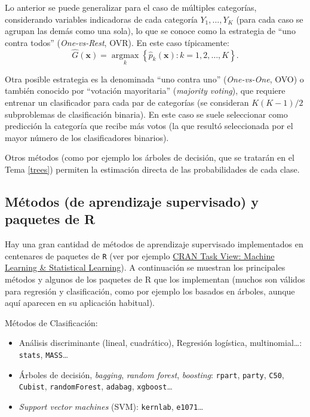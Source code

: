 \documentclass[
]{book}
\theoremstyle{break}
\theoremstyle{nonumberplain}
\begin{document}
Lo anterior se puede generalizar para el caso de múltiples categorías, considerando variables indicadoras de cada categoría \(Y_1, \ldots, Y_K\) (para cada caso se agrupan las demás como una sola), lo que se conoce como la estrategia de ``uno contra todos'' (\emph{One-vs-Rest}, OVR).
En este caso típicamente: \[\hat G \left(\mathbf{x} \right) = \underset{k}{\operatorname{argmax}} \left\{ \hat p_k(\mathbf{x}) : k = 1, 2, \ldots, K \right\}.\]

Otra posible estrategia es la denominada ``uno contra uno'' (\emph{One-vs-One}, OVO) o también conocido por ``votación mayoritaria'' (\emph{majority voting}), que requiere entrenar un clasificador para cada par de categorías (se consideran \(K(K-1)/2\) subproblemas de clasificación binaria).
En este caso se suele seleccionar como predicción la categoría que recibe más votos (la que resultó seleccionada por el mayor número de los clasificadores binarios).

Otros métodos (como por ejemplo los árboles de decisión, que se tratarán en el Tema \ref{trees}) permiten la estimación directa de las probabilidades de cada clase.

\hypertarget{metodos-pkgs}{%
\subsection{Métodos (de aprendizaje supervisado) y paquetes de R}\label{metodos-pkgs}}

Hay una gran cantidad de métodos de aprendizaje supervisado implementados en centenares de paquetes de \texttt{R} (ver por ejemplo \href{https://cran.r-project.org/web/views/MachineLearning.html}{CRAN Task View: Machine Learning \& Statistical Learning}).
A continuación se muestran los principales métodos y algunos de los paquetes de R que los implementan (muchos son válidos para regresión y clasificación, como por ejemplo los basados en árboles, aunque aquí aparecen en su aplicación habitual).

Métodos de Clasificación:

\begin{itemize}
\item
  Análisis discriminante (lineal, cuadrático), Regresión logística, multinomial\ldots: \texttt{stats}, \texttt{MASS}\ldots{}
\item
  Árboles de decisión, \emph{bagging}, \emph{random forest}, \emph{boosting}: \texttt{rpart}, \texttt{party}, \texttt{C50}, \texttt{Cubist}, \texttt{randomForest}, \texttt{adabag}, \texttt{xgboost}\ldots{}
\item
  \emph{Support vector machines} (SVM): \texttt{kernlab}, \texttt{e1071}\ldots{}
\end{itemize}
\end{document}

